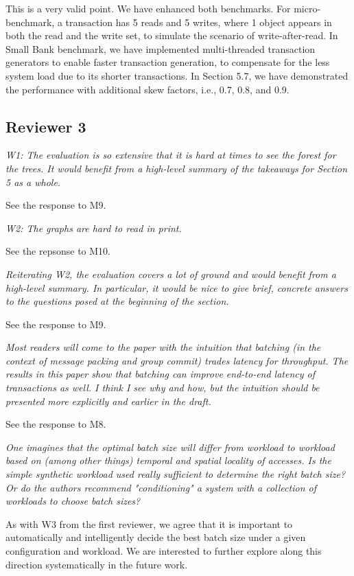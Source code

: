 \documentclass{article}
\begin{document}
This is a very valid point. We have enhanced both benchmarks. For micro-benchmark, a transaction has 5 reads and 5 writes, where 1 object appears in both the read and the write set, to simulate the scenario of write-after-read. In Small Bank benchmark, we have implemented multi-threaded transaction generators to enable faster transaction generation, to compensate for the less system load due to its shorter transactions. In Section 5.7, we have demonstrated the performance with additional skew factors, i.e., 0.7, 0.8, and 0.9.

\subsection{Reviewer 3}

\emph{W1: The evaluation is so extensive that it is hard at times to see the forest for the trees. It would benefit from a high-level summary of the takeaways for Section 5 as a whole. }

See the response to M9.

\emph{W2: The graphs are hard to read in print.}

See the repsonse to M10.

\emph{Reiterating W2, the evaluation covers a lot of ground and would benefit from a high-level summary. In particular, it would be nice to give brief, concrete answers to the questions posed at the beginning of the section.}

See the response to M9.

\emph{Most readers will come to the paper with the intuition that batching (in the context of message packing and group commit) trades latency for throughput. The results in this paper show that batching can improve end-to-end latency of transactions as well. I think I see why and how, but the intuition should be presented more explicitly and earlier in the draft.}

See the response to M8.

\emph{One imagines that the optimal batch size will differ from workload to workload based on (among other things) temporal and spatial locality of accesses. Is the simple synthetic workload used really sufficient to determine the right batch size? Or do the authors recommend "conditioning" a system with a collection of workloads to choose batch sizes?}

As with W3 from the first reviewer, we agree that it is important to automatically and intelligently decide the best batch size under a given configuration and workload. We are interested to further explore along this direction systematically in the future work. 
\end{document}
